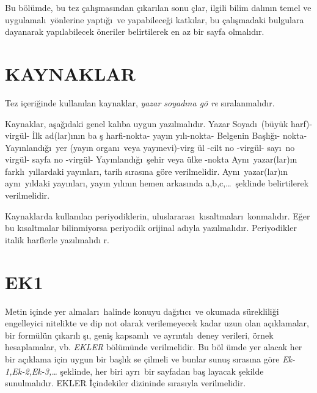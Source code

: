 \documentclass[fleqn,oneside]{akdenizuni}
\theoremstyle{plain}
\theoremstyle{definition}
\begin{document}
Bu b\"{o}l\"{u}mde, bu tez \c{c}al\i \c{s}mas\i ndan \c{c}\i kar\i lan sonu%
\c{c}lar, ilgili bilim dal\i n\i n temel ve uygulamal\i\ y\"{o}nlerine
yapt\i \u{g}\i\ ve yapabilece\u{g}i katk\i lar, bu \c{c}al\i \c{s}madaki
bulgulara dayanarak yap\i labilecek \"{o}neriler belirtilerek en az bir
sayfa olmal\i d\i r.

\chapter{KAYNAKLAR}

\nocite{*} 



Tez i\c{c}eri\u{g}inde kullan\i lan kaynaklar, \emph{yazar soyad\i na g\"{o}%
re} s\i ralanmal\i d\i r.

Kaynaklar, a\c{s}a\u{g}\i daki genel kal\i ba uygun yaz\i lmal\i d\i r.
Yazar Soyad\i\ (b\"{u}y\"{u}k harf)-virg\"{u}l- \.{I}lk ad(lar)\i n\i n ba%
\c{s} harfi-nokta- yay\i n y\i l\i -nokta- Belgenin Ba\c{s}l\i \u{g}\i -
nokta- Yay\i nland\i \u{g}\i\ yer (yay\i n organ\i\ veya yay\i nevi)-virg%
\"{u}l -cilt no -virg\"{u}l- say\i\ no virg\"{u}l- sayfa no -virg\"{u}l-
Yay\i nland\i \u{g}\i\ \c{s}ehir veya \"{u}lke -nokta Ayn\i\ yazar(lar)\i n
farkl\i\ y\i llardaki yay\i nlar\i , tarih s\i ras\i na g\"{o}re
verilmelidir. Ayn\i\ yazar(lar)\i n ayn\i\ y\i ldaki yay\i nlar\i , yay\i n
y\i l\i n\i n hemen arkas\i nda a,b,c,\dots\ \c{s}eklinde belirtilerek
verilmelidir.

Kaynaklarda kullan\i lan periyodiklerin, uluslararas\i\ k\i saltmalar\i\
konmal\i d\i r. E\u{g}er bu k\i saltmalar bilinmiyorsa periyodik orijinal
ad\i yla yaz\i lmal\i d\i r. Periyodikler italik harflerle yaz\i lmal\i d\i
r.

\appendix

\chapter{EK1}

Metin i\c{c}inde yer almalar\i\ halinde konuyu da\u{g}\i t\i c\i\ ve okumada
s\"{u}reklili\u{g}i engelleyici nitelikte ve dip not olarak verilemeyecek
kadar uzun olan a\c{c}\i klamalar, bir form\"{u}l\"{u}n \c{c}\i kar\i l\i 
\c{s}\i , geni\c{s} kapsaml\i\ ve ayr\i nt\i l\i\ deney verileri, \"{o}rnek
hesaplamalar, vb. \emph{EKLER} b\"{o}l\"{u}m\"{u}nde verilmelidir. Bu b\"{o}l%
\"{u}mde yer alacak her bir a\c{c}\i klama i\c{c}in uygun bir ba\c{s}l\i k se%
\c{c}ilmeli ve bunlar sunu\c{s} s\i ras\i na g\"{o}re \emph{%
Ek-1,Ek-2,Ek-3,\ldots } \c{s}eklinde, her biri ayr\i\ bir sayfadan ba\c{s}%
layacak \c{s}ekilde sunulmal\i d\i r. EKLER \.{I}\c{c}indekiler dizininde
s\i ras\i yla verilmelidir.
\end{document}
